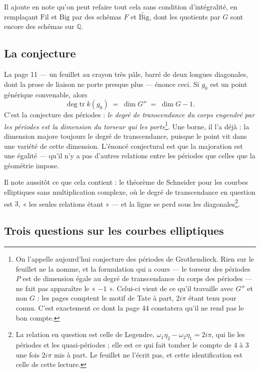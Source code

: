 \documentclass[11pt,a4paper]{article}
\begin{document}
Il ajoute en note qu'on peut refaire tout cela sans condition d'intégralité, en
remplaçant $\mathrm{Fil}$ et $\mathrm{Big}$ par des schémas $F$ et
$\widetilde{\mathrm{Big}}$, dont les quotients par $G$ sont encore des schémas
sur $\mathbb{Q}$.

\subsection*{La conjecture}

La page 11 — un feuillet au crayon très pâle, barré de deux longues diagonales,
dont la prose de liaison ne porte presque plus — énonce ceci. Si $g_{0}$ est un
point générique convenable, alors
\[
  \deg\mathrm{tr}\; k(g_{0}) \;=\; \dim G'' \;=\; \dim G - 1 .
\]
C'est la conjecture des périodes : \emph{le degré de transcendance du corps
engendré par les périodes est la dimension du torseur qui les porte}\footnote{On
l'appelle aujourd'hui conjecture des périodes de Grothendieck. Rien sur le
feuillet ne la nomme, et la formulation qui a cours — le torseur des périodes
$P$ est de dimension égale au degré de transcendance du corps des périodes — ne
fait pas apparaître le « $-1$ ». Celui-ci vient de ce qu'il travaille avec
$G''$ et non $G$ : les pages comptent le motif de Tate à part, $2i\pi$ étant
tenu pour connu. C'est exactement ce dont la page 44 constatera qu'il ne rend
pas le bon compte.}. Une borne, il l'a déjà : la dimension majore toujours le
degré de transcendance, puisque le point vit dans une variété de cette
dimension. L'énoncé conjectural est que la majoration est une égalité — qu'il
n'y a pas d'autres relations entre les périodes que celles que la géométrie
impose.

Il note aussitôt ce que cela contient : le théorème de Schneider pour les
courbes elliptiques sans multiplication complexe, où le degré de transcendance
en question est $3$, « les seules relations étant » — et la ligne se perd sous
les diagonales\footnote{La relation en question est celle de Legendre,
$\omega_{1}\eta_{2} - \omega_{2}\eta_{1} = 2i\pi$, qui lie les périodes et les
quasi-périodes ; elle est ce qui fait tomber le compte de $4$ à $3$ une fois
$2i\pi$ mis à part. Le feuillet ne l'écrit pas, et cette identification est
celle de cette lecture.}.

\subsection*{Trois questions sur les courbes elliptiques}
\end{document}
